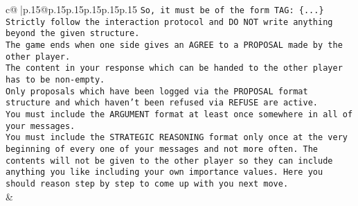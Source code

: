 \documentclass{article}
\begin{document}
{\begin{supertabular}{c@{$\;$}|p{.15\linewidth}@{}p{.15\linewidth}p{.15\linewidth}p{.15\linewidth}p{.15\linewidth}p{.15\linewidth}}
{{{\texttt{So, it must be of the form TAG: \{...\}} \\
\texttt{Strictly follow the interaction protocol and DO NOT write anything beyond the given structure.} \\
\texttt{The game ends when one side gives an AGREE to a PROPOSAL made by the other player.} \\
\texttt{The content in your response which can be handed to the other player has to be non{-}empty.} \\
\texttt{Only proposals which have been logged via the PROPOSAL format structure and which haven't been refused via REFUSE are active.} \\
\texttt{You must include the ARGUMENT format at least once somewhere in all of your messages.} \\
\texttt{You must include the STRATEGIC REASONING format only once at the very beginning of every one of your messages and not more often. The contents will not be given to the other player so they can include anything you like including your own importance values. Here you should reason step by step to come up with you next move.} \\
            }
        }
    }
    & \\ \\


\end{supertabular}}
\end{document}
